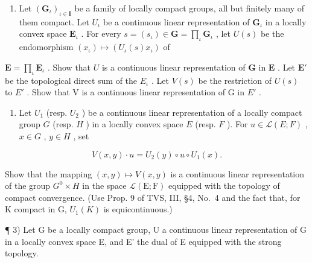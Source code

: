 \exercisesection{}

\begin{enumerate}
\def\labelenumi{\arabic{enumi})}
\tightlist
\item
  Let \((\mathbf{G}_{\iota})_{\iota \in \mathbf{I}}\) be a family of locally compact groups, all but finitely many of them compact. Let \(U_{\iota}\) be a continuous linear representation of \(\mathbf{G}_{\iota}\) in a locally convex space \(\mathbf{E}_{\iota}\) . For every \(s = (s_{\iota}) \in \mathbf{G} = \prod_{\iota} \mathbf{G}_{\iota}\) , let \(U(s)\) be the endomorphism \((x_{\iota}) \mapsto (U_{\iota}(s)x_{\iota})\) of
\end{enumerate}

\(\mathbf{E} = \prod_{\iota}\mathbf{E}_{\iota}\) . Show that \(U\) is a continuous linear representation of \(\mathbf{G}\) in \(\mathbf{E}\) . Let \(\mathbf{E}'\) be the topological direct sum of the \(E_{\iota}\) . Let \(V(s)\) be the restriction of \(U(s)\) to \(E'\) . Show that V is a continuous linear representation of G in \(E'\) .

\begin{enumerate}
\def\labelenumi{\arabic{enumi})}
\setcounter{enumi}{1}
\tightlist
\item
  Let \(U_{1}\) (resp. \(U_{2}\) ) be a continuous linear representation of a locally compact group \(G\) (resp. \(H\) ) in a locally convex space \(E\) (resp. \(F\) ). For \(u \in \mathcal{L}(E; F)\) , \(x \in G\) , \(y \in H\) , set
\end{enumerate}

\[
V (x, y) \cdot u = U _ {2} (y) \circ u \circ U _ {1} (x).
\]

Show that the mapping \((x,y)\mapsto V(x,y)\) is a continuous linear representation of the group \(G^{0}\times H\) in the space \(\mathcal{L}(\mathrm{E};\mathrm{F})\) equipped with the topology of compact convergence. (Use Prop. 9 of TVS, III, §4, No.~4 and the fact that, for K compact in G, \(U_{1}(K)\) is equicontinuous.)

¶ 3) Let G be a locally compact group, U a continuous linear representation of G in a locally convex space E, and E' the dual of E equipped with the strong topology.

